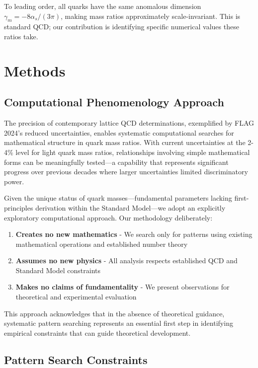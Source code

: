 \documentclass[12pt]{article}
\begin{document}
To leading order, all quarks have the same anomalous dimension $\gamma_m = -8\alpha_s/(3\pi)$, making mass ratios approximately scale-invariant. This is standard QCD; our contribution is identifying specific numerical values these ratios take.

\section{Methods}

\subsection{Computational Phenomenology Approach}

The precision of contemporary lattice QCD determinations, exemplified by FLAG 2024's reduced uncertainties, enables systematic computational searches for mathematical structure in quark mass ratios. With current uncertainties at the 2-4\% level for light quark mass ratios, relationships involving simple mathematical forms can be meaningfully tested—a capability that represents significant progress over previous decades where larger uncertainties limited discriminatory power.

Given the unique status of quark masses—fundamental parameters lacking first-principles derivation within the Standard Model—we adopt an explicitly exploratory computational approach. Our methodology deliberately:

\begin{enumerate}
\item \textbf{Creates no new mathematics} - We search only for patterns using existing mathematical operations and established number theory
\item \textbf{Assumes no new physics} - All analysis respects established QCD and Standard Model constraints
\item \textbf{Makes no claims of fundamentality} - We present observations for theoretical and experimental evaluation
\end{enumerate}

This approach acknowledges that in the absence of theoretical guidance, systematic pattern searching represents an essential first step in identifying empirical constraints that can guide theoretical development.

\subsection{Pattern Search Constraints}
\end{document}

